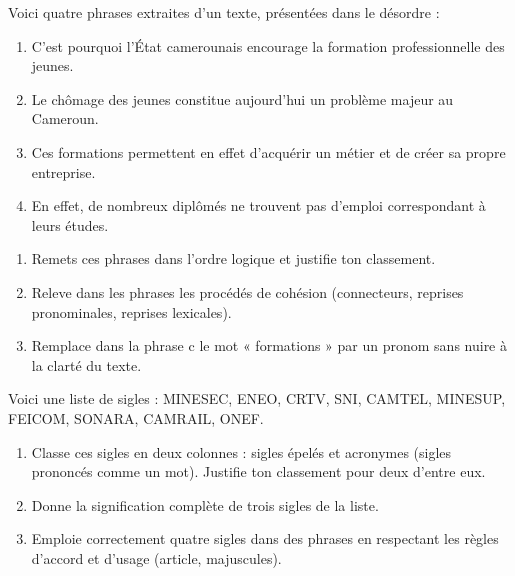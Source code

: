 \documentclass[11pt]{article}
\newcounter{popsec}
\newcounter{popsub}
\newcommand{\courssub}[1]{%
  \stepcounter{popsub}%
  \par\vspace{9pt}\noindent{\popxbold\fontsize{11.5}{13}\selectfont\color{popink}{\color{poporange}\thepopsec.\thepopsub}\hspace{6pt}#1}\par\nopagebreak\vspace{4pt}
}
\begin{document}
\begin{exercice}
Voici quatre phrases extraites d'un texte, présentées dans le désordre :
\begin{enumerate}
\item[a.] C'est pourquoi l'État camerounais encourage la formation professionnelle des jeunes.
\item[b.] Le chômage des jeunes constitue aujourd'hui un problème majeur au Cameroun.
\item[c.] Ces formations permettent en effet d'acquérir un métier et de créer sa propre entreprise.
\item[d.] En effet, de nombreux diplômés ne trouvent pas d'emploi correspondant à leurs études.
\end{enumerate}
\begin{enumerate}
\item Remets ces phrases dans l'ordre logique et justifie ton classement.
\item Releve dans les phrases les procédés de cohésion (connecteurs, reprises pronominales, reprises lexicales).
\item Remplace dans la phrase c le mot « formations » par un pronom sans nuire à la clarté du texte.
\end{enumerate}
\end{exercice}

\begin{exercice}
Voici une liste de sigles : MINESEC, ENEO, CRTV, SNI, CAMTEL, MINESUP, FEICOM, SONARA, CAMRAIL, ONEF.
\begin{enumerate}
\item Classe ces sigles en deux colonnes : sigles épelés et acronymes (sigles prononcés comme un mot). Justifie ton classement pour deux d'entre eux.
\item Donne la signification complète de trois sigles de la liste.
\item Emploie correctement quatre sigles dans des phrases en respectant les règles d'accord et d'usage (article, majuscules).
\end{enumerate}
\end{exercice}

\courssub{Je me prépare au Bac}
\end{document}
